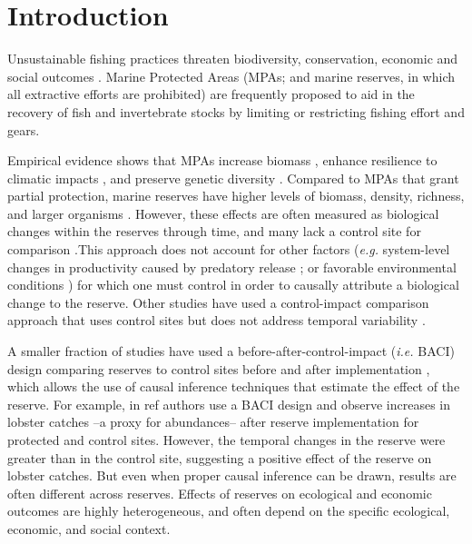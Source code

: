 \documentclass[10pt,letterpaper]{article}
\begin{document}
\linenumbers

\section*{Introduction}

Unsustainable fishing practices threaten biodiversity, conservation, economic and social outcomes \cite{pauly_2005-qV,halpern_2008-dK}. Marine Protected Areas (MPAs; and marine reserves, in which all extractive efforts are prohibited) are frequently proposed to aid in the recovery of fish and invertebrate stocks \cite{lester_2008-F_,lester_2009-Ks,sala_2016-PV,hastings_2017-sm} by limiting or restricting fishing effort and gears.

Empirical evidence shows that MPAs increase biomass \cite{aburtooropeza_2011-ya,lester_2009-Ks}, enhance resilience to climatic impacts \cite{micheli_2012-EU,roberts_2017-J9}, and preserve genetic diversity \cite{munguavega_2015-yg}. Compared to MPAs that grant partial protection, marine reserves have higher levels of biomass, density, richness, and larger organisms \cite{lester_2008-F_,edgar_2014-UO,giakoumi_2017-V2,sala_2017-69}. However, these effects are often measured as biological changes within the reserves through time, and many lack a control site for comparison \cite{betti_2017-lq}.This approach does not account for other factors (\emph{e.g.} system-level changes in productivity caused by predatory release \cite{szuwalski_2017-jc}; or favorable environmental conditions \cite{chavez_2003-mm}) for which one must control \cite{davies_2017-ml} in order to causally attribute a biological change to the reserve. Other studies have used a control-impact comparison approach that uses control sites but does not address temporal variability \cite{guidetti_2014-8Z,friedlander_2017-oI,lester_2009-Ks,aburtooropeza_2011-ya,rodriguez_2017-PD}.

A smaller fraction of studies have used a before-after-control-impact (\emph{i.e.} BACI) design comparing reserves to control sites before and after implementation \cite{moland_2013-VP,soykan_2015-nu,lester_2009-Ks}, which allows the use of causal inference techniques that estimate the effect of the reserve. For example, in ref \cite{moland_2013-VP} authors use a BACI design and observe increases in lobster catches --a proxy for abundances-- after reserve implementation for protected and control sites. However, the temporal changes in the reserve were greater than in the control site, suggesting a positive effect of the reserve on lobster catches. But even when proper causal inference can be drawn, results are often different across reserves. Effects of reserves on ecological and economic outcomes are highly heterogeneous, and often depend on the specific ecological, economic, and social context.
\end{document}
